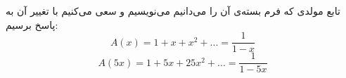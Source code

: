 \p
تابع مولدی که فرم بسته‌ی آن را می‌دانیم می‌نویسیم و سعی می‌کنیم با تغییر آن به پاسخ برسیم:
$$A(x) = 1 + x + x^2 + ... = \frac{1}{1 - x}$$
$$A(5x) = 1 + 5x + 25x^2 + ... = \frac{1}{1 - 5x}$$
 
